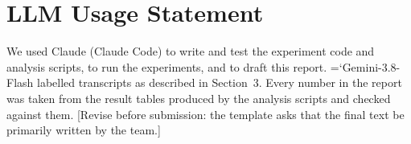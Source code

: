 \documentclass[10pt]{article}
\newcommand{\model}[1]{{\ttfamily\hyphenchar\font=`\-\relax #1}}
\begin{document}
\section{LLM Usage Statement}
We used Claude (Claude Code) to write and test the experiment code and analysis scripts, to run the experiments, and to draft this report. \model{Gemini-3.8-Flash} labelled transcripts as described in Section~3. Every number in the report was taken from the result tables produced by the analysis scripts and checked against them. [Revise before submission: the template asks that the final text be primarily written by the team.]
\end{document}
